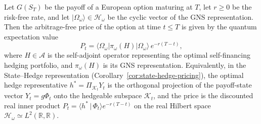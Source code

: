 \begin{theorem}\label{thm:optimal-hedge}
Let $G(S_T)$ be the payoff of a European option maturing at $T$, let $r \geq 0$ be
the risk-free rate, and let $|\Omega_\omega\rangle \in \mathcal{H}_\omega$ be the
cyclic vector of the GNS representation. Then the arbitrage-free price of the option
at time $t \leq T$ is given by the quantum expectation value
\begin{equation}\label{eq:pricing-formula-basic}
    P_t = \langle \Omega_\omega | \pi_\omega(H) | \Omega_\omega \rangle
    \, e^{-r(T-t)},
\end{equation}
where $H \in \mathcal{A}$ is the self-adjoint operator representing the optimal
self-financing hedging portfolio, and $\pi_\omega(H)$ is its GNS representation.
Equivalently, in the State--Hedge representation
(Corollary~\ref{cor:state-hedge-pricing}), the optimal hedge representative
$h^* = \Pi_{\mathcal{K}_t} Y_t$ is the orthogonal projection of the payoff-state
vector $Y_t = g \Phi_t$ onto the hedgeable subspace $\mathcal{K}_t$, and the price
is the discounted real inner product
$P_t = \langle h^* \,|\, \Phi_t \rangle e^{-r(T-t)}$ on the real Hilbert space
$\mathcal{H}_\omega \simeq L^2(\mathbb{R}, \mathbb{R})$.
\end{theorem}

